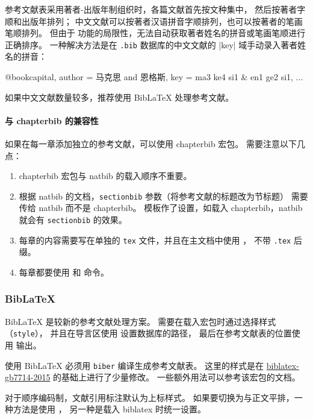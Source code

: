 \documentclass[a4paper]{ltxdoc}
\DeclareRobustCommand\file{\nolinkurl}
\DeclareRobustCommand\pkg{\textsf}
\DeclareRobustCommand\opt{\texttt}
\begin{document}
参考文献表采用著者-出版年制组织时，各篇文献首先按文种集中， 然后按著者字顺和出版年排列；
中文文献可以按著者汉语拼音字顺排列，也可以按著者的笔画笔顺排列。
但由于 \BibTeX{} 功能的局限性，无法自动获取著者姓名的拼音或笔画笔顺进行正确排序。
一种解决方法是在 \file{.bib} 数据库的中文文献的 |key| 域手动录入著者姓名的拼音：
\begin{latex}
  @book{capital,
    author = {马克思 and 恩格斯},
    key    = {ma3 ke4 si1 & en1 ge2 si1},
    ...
  }
\end{latex}
如果中文文献数量较多，推荐使用 BibLaTeX 处理参考文献。

\paragraph{与 \pkg{chapterbib} 的兼容性}
如果在每一章添加独立的参考文献，可以使用 \pkg{chapterbib} 宏包。
需要注意以下几点：
\begin{enumerate}
  \item \pkg{chapterbib} 宏包与 \pkg{natbib} 的载入顺序不重要。
  \item 根据 \pkg{natbib} 的文档，\opt{sectionbib} 参数（将参考文献的标题改为节标题）
    需要传给 \pkg{natbib} 而不是 \pkg{chapterbib}。
    模板作了设置，如载入 \pkg{chapterbib}，\pkg{natbib} 就会有 \opt{sectionbib} 的效果。
  \item 每章的内容需要写在单独的 \file{tex} 文件，并且在主文档中使用 ，
    不带 \file{.tex} 后缀。
  \item 每章都要使用  和  命令。
\end{enumerate}


\subsubsection{BibLaTeX}

BibLaTeX 是较新的参考文献处理方案。
需要在载入宏包时通过选择样式（\opt{style}），
并且在导言区使用  设置数据库的路径，
最后在参考文献表的位置使用  输出。
\begin{latex}
  \usepackage[style=ustcthesis-author-year]{biblatex}
  
\end{latex}
使用 BibLaTeX 必须用 \file{biber} 编译生成参考文献表。
这里的样式是在 \href{https://ctan.org/pkg/biblatex-gb7714-2015}{biblatex-gb7714-2015}
的基础上进行了少量修改。
一些额外用法可以参考该宏包的文档。

对于顺序编码制，文献引用标注默认为上标样式。
如果要切换为与正文平排，一种方法是使用 ，
另一种是载入 \pkg{biblatex} 时统一设置。
\begin{latex}
  \usepackage[bibstyle=ustcthesis-numeric,citestyle=ustcthesis-inline]{biblatex}
\end{latex}
\end{document}
